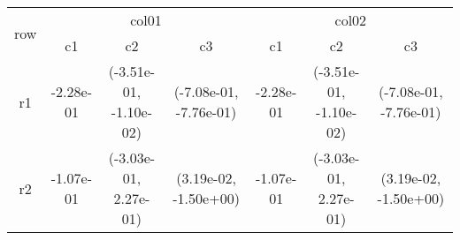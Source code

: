 \begin{tabular}{ccccccc}
\toprule
\multirow{2}{*}{row}&\multicolumn{3}{c}{col01}&\multicolumn{3}{c}{col02}\tabularnewline
\cmidrule(lr){2-4}
\cmidrule(lr){5-7}
&c1&c2&c3&c1&c2&c3\tabularnewline
\midrule
r1&-2.28e-01& (-3.51e-01, -1.10e-02)& (-7.08e-01, -7.76e-01)&-2.28e-01& (-3.51e-01, -1.10e-02)& (-7.08e-01, -7.76e-01)\tabularnewline
r2&-1.07e-01& (-3.03e-01, 2.27e-01)& (3.19e-02, -1.50e+00)&-1.07e-01& (-3.03e-01, 2.27e-01)& (3.19e-02, -1.50e+00)\tabularnewline
\bottomrule
\end{tabular}
